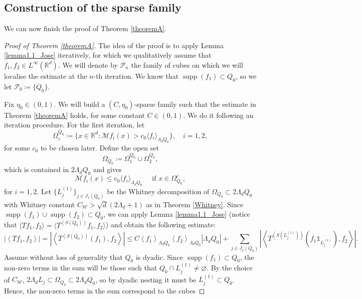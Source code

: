 \documentclass[12pt]{amsart}
\newcommand{\R}{\mathbb{R}}
\newcommand{\supp}[1]{\operatorname{supp}\left(#1\right) }
\newcommand{\one}{\mathds{1}}
\theoremstyle{plain}
\theoremstyle{definition} %
\numberwithin{equation}{section}
\begin{document}
\subsection{Construction of the sparse family} We can now finish the proof of Theorem \ref{theoremA}. 

\begin{proof}[Proof of Theorem \ref{theoremA}] The idea of the proof is to apply Lemma \ref{lemma1.1_Jose} iteratively, for which we qualitatively assume that $f_1,f_2 \in L^\infty(\mathbb{R}^d)$. We will denote by $\mathcal{P}_n$ the family of cubes on which we will localise the estimate at the $n$-th iteration. We know that $\supp{f_1}\subset Q_0$, so we let $\mathcal{P}_0\coloneqq \{Q_0\}$.

Fix $\eta_0\in (0,1)$. We will build a $(C,\eta_0)$-sparse family such that the estimate in Theorem \ref{theoremA} holds, for some constant $C\in (0,1)$. We do it following an iteration procedure. For the first iteration, let 
    \[
    \Omega_i^{Q_0}
    \coloneqq 
    \{
    x\in\R^d: \mathcal{M}f_i(x)>c_0\langle f_i\rangle_{\Lambda_{d} Q_0}
    \},\quad i=1,2,
    \]
    for some $c_0$ to be chosen later. Define the open set
    \[
    \Omega_{Q_0}
    \coloneqq 
    \Omega_1^{Q_0}\cup \Omega_2^{Q_0},
    \]
which is contained in $2\Lambda_d Q_0$ and gives
\[
\mathcal{M}f_i(x)\leq c_0\langle f_i\rangle_{\Lambda_d Q_0}\quad \text{ if }x\in\Omega_{Q_0}^{c},
\]
for $i=1,2$. Let $\{L_j^{(1)}\}_{j\in J_1(Q_0)}$ be the Whitney decomposition of $\Omega_{Q_0}\subset 2\Lambda_dQ_0$ with Whitney constant $C_{\mathcal{W}}>\sqrt{d}(2\Lambda_d+1)$ as in Theorem \ref{Whitney}. Since $\supp{f_1}\cup \supp{f_2}\subset Q_0$, we can apply Lemma \ref{lemma1.1_Jose} (notice that $\langle Tf_1,f_2\rangle =\langle T^{(S(Q_0))}f_1,f_2\rangle$) and obtain the following estimate:
    \begin{equation}\label{eq:Level0Bound}
        \left|\left\langle Tf_1, f_2\right\rangle\right| = \left|\left\langle T^{(S(Q_0))} (f_1), f_2\right\rangle\right|
        \leq
        C\left\langle f_1\right\rangle_{\Lambda_dQ_0}\left\langle f_2\right\rangle_{\Lambda_dQ_0}|\Lambda_dQ_0|
        +
        \sum_{j\in J_1(Q_0)}\left|\left\langle T^{(S(L_j^{(1)}))} (f_1 \one_{L_j^{(1)}}), f_2\right\rangle\right|.
    \end{equation}
    Assume without loss of generality that $Q_0$ is dyadic. Since $\supp{f_1}\subset Q_0$, the non-zero terms in the sum will be those such that $Q_0\cap L_j^{(1)}\neq\varnothing$. By the choice of $C_{\mathcal{W}}$, $2\Lambda_d L_j\subset \Omega_{Q_0}\subset 2\Lambda_d Q_0$, so by dyadic nesting it must be $L_j^{(1)}\subset Q_0$. Hence, the non-zero terms in the sum correspond to the cubes 

\end{proof}
\end{document}
